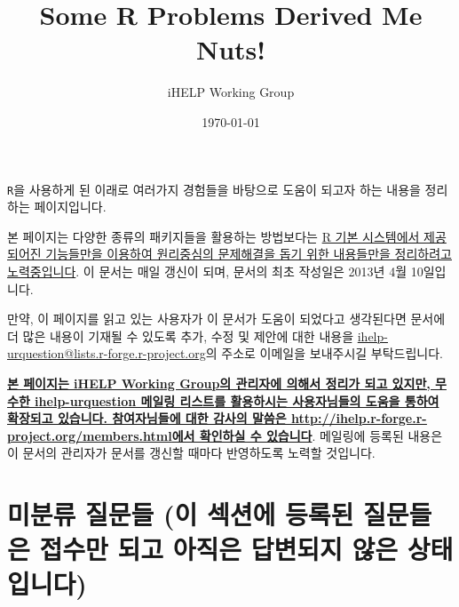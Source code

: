 \documentclass{article}
\title{Some R Problems Derived Me Nuts!}
\author{iHELP Working Group}
\date{\today}
\begin{document}
\maketitle

\texttt{R}을 사용하게 된 이래로 여러가지 경험들을 바탕으로 도움이 되고자 하는 내용을 정리하는 페이지입니다.

본 페이지는 다양한 종류의 패키지들을 활용하는 방법보다는 \underline{R 기본 시스템에서 제공되어진 기능들만을 이용하여 원리중심의 문제해결을 돕기 위한 내용들만을 정리하려고 노력중입니다}. 
이 문서는 매일 갱신이 되며, 문서의 최초 작성일은 2013년 4월 10일입니다.

만약, 이 페이지를 읽고 있는 사용자가 이 문서가 도움이 되었다고 생각된다면 문서에 더 많은 내용이 기재될 수 있도록 추가, 수정 및 제안에 대한 내용을 \href{mailto:ihelp-urquestion@lists.r-forge.r-project.org}{ihelp-urquestion@lists.r-forge.r-project.org}의 주소로 이메일을 보내주시길 부탁드립니다. 

\textbf{\underline{본 페이지는 iHELP Working Group의 관리자에 의해서 정리가 되고 있지만, 무수한 ihelp-urquestion 메일링 리스트를 활용하시는 사용자님들의 도움을 통하여 확장되고 있습니다.
참여자님들에 대한 감사의 말씀은 \url{http://ihelp.r-forge.r-project.org/members.html}에서 확인하실 수 있습니다}}.  
%
메일링에 등록된 내용은 이 문서의 관리자가 문서를 갱신할 때마다 반영하도록 노력할 것입니다.


%
%

\section{미분류 질문들 (이 섹션에 등록된 질문들은 접수만 되고 아직은 답변되지 않은 상태입니다)}



\end{document}
